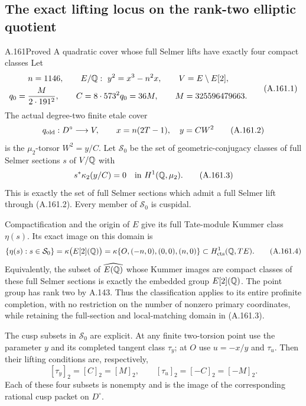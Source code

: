 \subsection{The exact lifting locus on the rank-two elliptic quotient}

\begin{statement}{A.161}{Proved}
{A quadratic cover whose full Selmer lifts have exactly four compact classes}
Let
\[
 \begin{gathered}
 n=1146,\qquad E/\mathbb Q:\ y^2=x^3-n^2x,\qquad
 V=E\setminus E[2],\\
 q_0=\frac{M}{2\cdot191^2},\qquad
 C=8\cdot573^2q_0=36M,\qquad M=325596479663.
 \end{gathered}
\tag{A.161.1}
\]
The actual degree-two finite etale cover
\[
 q_{\rm old}:D^\circ\longrightarrow V,
       \qquad x=n(2T-1),\quad y=CW^2
\tag{A.161.2}
\]
is the \(\mu_2\)-torsor \(W^2=y/C\).  Let
\(\mathcal S_0\) be the set of geometric-conjugacy
classes of full Selmer sections \(s\) of \(V/\mathbb Q\)
with
\[
                       s^*\kappa_2(y/C)=0
                                  \quad\text{in }H^1(\mathbb Q,\mu_2).
\tag{A.161.3}
\]
This is exactly the set of full Selmer sections which
admit a full Selmer lift through (A.161.2).
Every member of \(\mathcal S_0\) is cuspidal.

Compactification and the origin of \(E\) give its
full Tate-module Kummer class \(\eta(s)\).  Its exact
image on this domain is
\[
       \{\eta(s):s\in\mathcal S_0\}
         =\kappa\bigl(E[2](\mathbb Q)\bigr)
         =\kappa\{O,(-n,0),(0,0),(n,0)\}
       \subset H^1_{\rm cts}(\mathbb Q,TE).
\tag{A.161.4}
\]
Equivalently, the subset of \(\widehat{E(\mathbb Q)}\) whose
Kummer images are compact classes of these full Selmer
sections is exactly the embedded group \(E[2](\mathbb Q)\).
The point group has rank two by A.143.  Thus the
classification applies to its entire profinite completion,
with no restriction on the number of nonzero primary
coordinates, while retaining the full-section and
local-matching domain in (A.161.3).

The cusp subsets in \(\mathcal S_0\) are explicit.
At any finite two-torsion point use the parameter \(y\)
and its completed tangent class \(\tau_y\); at \(O\)
use \(u=-x/y\) and \(\tau_u\).  Then their lifting
conditions are, respectively,
\[
             [\tau_y]_2=[C]_2=[M]_2,
             \qquad [\tau_u]_2=[-C]_2=[-M]_2.
\tag{A.161.5}
\]
Each of these four subsets is nonempty and is the
image of the corresponding rational cusp packet on
\(D^\circ\).
\end{statement}


